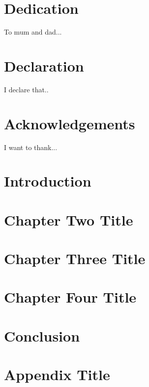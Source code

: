 \documentclass[12pt, twoside]{report}
\begin{document}


\chapter*{Dedication}
To mum and dad...

\chapter*{Declaration}
I declare that..

\chapter*{Acknowledgements}
I want to thank...

\tableofcontents

\listoffigures

\listoftables



\chapter{Introduction}


\chapter{Chapter Two Title}


\chapter{Chapter Three Title}


\chapter{Chapter Four Title}


\chapter{Conclusion}


\appendix
\chapter{Appendix Title}


\printbibliography
\end{document}
